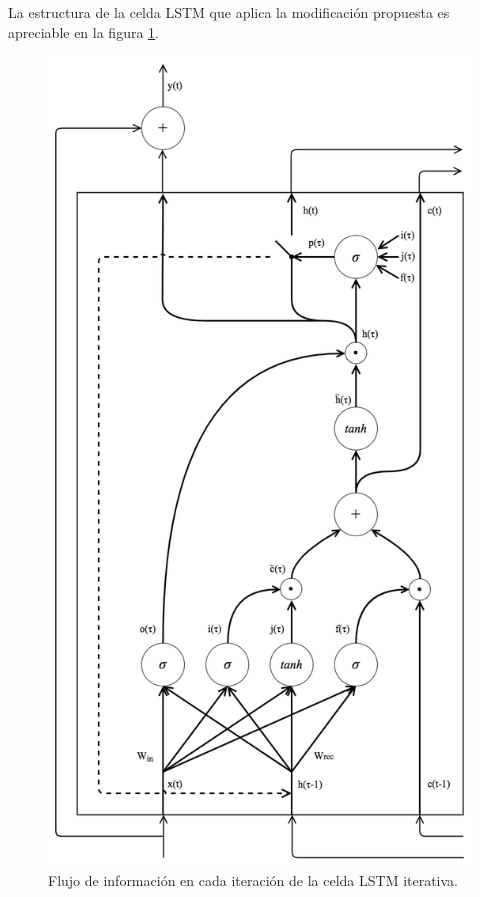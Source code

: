 \documentclass{article}
\begin{document}
	La estructura de la celda LSTM que aplica la modificación propuesta es apreciable en la figura \ref{iterativeLSTM}.
	\begin{figure}[H]
		\centering
		\includegraphics[scale=0.2]{iterativeLSTM.png}
		\caption{Flujo de información en cada iteración de la celda LSTM iterativa.}
		\label{iterativeLSTM}
	\end{figure}
	
\end{document}
